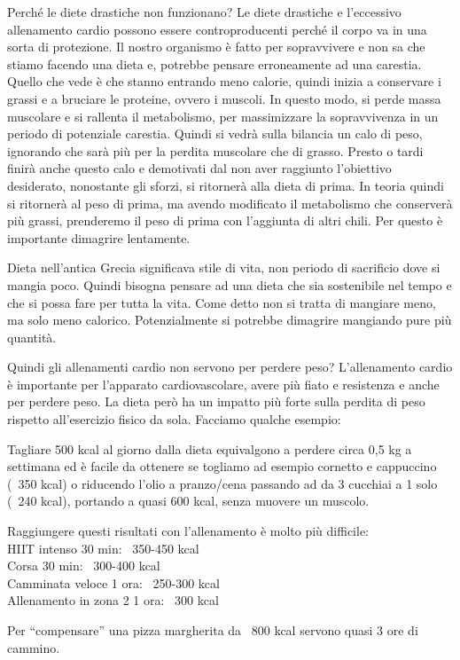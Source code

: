\documentclass[12pt]{book} %
\begin{document}
Perché le diete drastiche non funzionano?
Le diete drastiche e l'eccessivo allenamento cardio possono essere controproducenti perché il corpo va in una sorta di protezione. Il nostro organismo è fatto per sopravvivere e non sa che stiamo facendo una dieta e, potrebbe pensare erroneamente ad una carestia. Quello che vede è che stanno entrando meno calorie, quindi inizia a conservare i grassi e a bruciare le proteine, ovvero i muscoli. In questo modo, si perde massa muscolare e si rallenta il metabolismo, per massimizzare la sopravvivenza in un periodo di potenziale carestia. Quindi si vedrà sulla bilancia un calo di peso, ignorando che sarà più per la perdita muscolare che di grasso. Presto o tardi finirà anche questo calo e demotivati dal non aver raggiunto l'obiettivo desiderato, nonostante gli sforzi, si ritornerà alla dieta di prima. In teoria quindi si ritornerà al peso di prima, ma avendo modificato il metabolismo che conserverà più grassi, prenderemo il peso di prima con l'aggiunta di altri chili.
Per questo è importante dimagrire lentamente.

Dieta nell'antica Grecia significava stile di vita, non periodo di sacrificio dove si mangia poco. Quindi bisogna pensare ad una dieta che sia sostenibile nel tempo e che si possa fare per tutta la vita. Come detto non si tratta di mangiare meno, ma solo meno calorico. Potenzialmente si potrebbe dimagrire mangiando pure più quantità.

Quindi gli allenamenti cardio non servono per perdere peso?
L'allenamento cardio è importante per l'apparato cardiovascolare, avere più fiato e resistenza e anche per perdere peso. La dieta però ha un impatto più forte sulla perdita di peso rispetto all’esercizio fisico da sola. Facciamo qualche esempio:

Tagliare 500 kcal al giorno dalla dieta equivalgono a perdere circa 0,5 kg a settimana ed è facile da ottenere se togliamo ad esempio cornetto e cappuccino (~350 kcal) o riducendo l'olio a pranzo/cena passando ad da 3 cucchiai a 1 solo (~240 kcal), portando a quasi 600 kcal, senza muovere un muscolo.

Raggiungere questi risultati con l'allenamento è molto più difficile:\\
HIIT intenso 30 min: ~350-450 kcal\\
Corsa 30 min: ~300-400 kcal\\
Camminata veloce 1 ora: ~250-300 kcal\\
Allenamento in zona 2 1 ora: ~300 kcal

Per “compensare” una pizza margherita da ~800 kcal servono quasi 3 ore di cammino.
\end{document}
